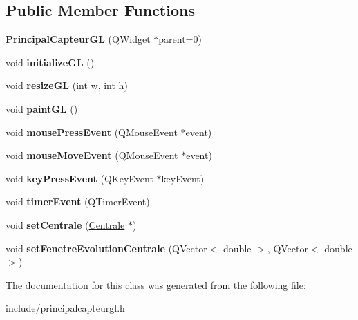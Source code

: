 \subsection*{Public Member Functions}
\begin{DoxyCompactItemize}
\item 
\hypertarget{class_principal_capteur_g_l_a84fb894a769cac7540e2776a0cb39986}{{\bfseries Principal\-Capteur\-G\-L} (Q\-Widget $\ast$parent=0)}\label{class_principal_capteur_g_l_a84fb894a769cac7540e2776a0cb39986}

\item 
\hypertarget{class_principal_capteur_g_l_a108845ea7fefdb783cf12aa7946c9c7c}{void {\bfseries initialize\-G\-L} ()}\label{class_principal_capteur_g_l_a108845ea7fefdb783cf12aa7946c9c7c}

\item 
\hypertarget{class_principal_capteur_g_l_ac9bdd6a2afeed01ecc356ea6f3ca0b17}{void {\bfseries resize\-G\-L} (int w, int h)}\label{class_principal_capteur_g_l_ac9bdd6a2afeed01ecc356ea6f3ca0b17}

\item 
\hypertarget{class_principal_capteur_g_l_a6882dcae35b25b9808a27843feb92a60}{void {\bfseries paint\-G\-L} ()}\label{class_principal_capteur_g_l_a6882dcae35b25b9808a27843feb92a60}

\item 
\hypertarget{class_principal_capteur_g_l_af2bf3493cb62bbe6416cd6ad7d8b20c3}{void {\bfseries mouse\-Press\-Event} (Q\-Mouse\-Event $\ast$event)}\label{class_principal_capteur_g_l_af2bf3493cb62bbe6416cd6ad7d8b20c3}

\item 
\hypertarget{class_principal_capteur_g_l_a3d68b0fe90f429dd75e2f35f815e356d}{void {\bfseries mouse\-Move\-Event} (Q\-Mouse\-Event $\ast$event)}\label{class_principal_capteur_g_l_a3d68b0fe90f429dd75e2f35f815e356d}

\item 
\hypertarget{class_principal_capteur_g_l_a55e9c15baa18d14bd6839fa346b5a0f6}{void {\bfseries key\-Press\-Event} (Q\-Key\-Event $\ast$key\-Event)}\label{class_principal_capteur_g_l_a55e9c15baa18d14bd6839fa346b5a0f6}

\item 
\hypertarget{class_principal_capteur_g_l_a2a85e89a4389f7eb1a3c541b57138beb}{void {\bfseries timer\-Event} (Q\-Timer\-Event)}\label{class_principal_capteur_g_l_a2a85e89a4389f7eb1a3c541b57138beb}

\item 
\hypertarget{class_principal_capteur_g_l_a16e55a8846f0579ee729260dd8d3754b}{void {\bfseries set\-Centrale} (\hyperlink{class_centrale}{Centrale} $\ast$)}\label{class_principal_capteur_g_l_a16e55a8846f0579ee729260dd8d3754b}

\item 
\hypertarget{class_principal_capteur_g_l_a72f5232558a0f7cb1e488bf3148a6592}{void {\bfseries set\-Fenetre\-Evolution\-Centrale} (Q\-Vector$<$ double $>$, Q\-Vector$<$ double $>$)}\label{class_principal_capteur_g_l_a72f5232558a0f7cb1e488bf3148a6592}

\end{DoxyCompactItemize}


The documentation for this class was generated from the following file\-:\begin{DoxyCompactItemize}
\item 
include/principalcapteurgl.\-h\end{DoxyCompactItemize}
